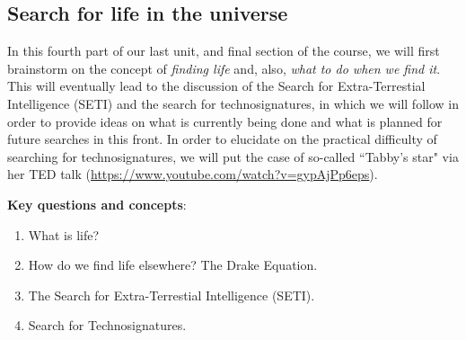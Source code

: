 \documentclass{tufte-handout}
\begin{document}
\begin{fullwidth}
\subsection{Search for life in the universe}
In this fourth part of our last unit, and final section of the course, we will first brainstorm on the concept of \textit{finding life} and, 
also, \textit{what to do when we find it}. This will eventually lead to the discussion of the Search for Extra-Terrestial Intelligence (SETI) and 
the search for technosignatures, in which we will follow \citet{techno} in order to provide ideas on what is currently being done and what is planned 
for future searches in this front. In order to elucidate on the practical difficulty of searching for technosignatures, we will put the case of so-called 
``Tabby's star" via her TED talk (\url{https://www.youtube.com/watch?v=gypAjPp6eps}). 

\vspace{0.5 cm}
\noindent \textbf{Key questions and concepts}:
\begin{enumerate}
\item What is life?
\item How do we find life elsewhere? The Drake Equation.
\item The Search for Extra-Terrestial Intelligence (SETI).
\item Search for Technosignatures.
\end{enumerate}
\end{fullwidth}

\end{document}
